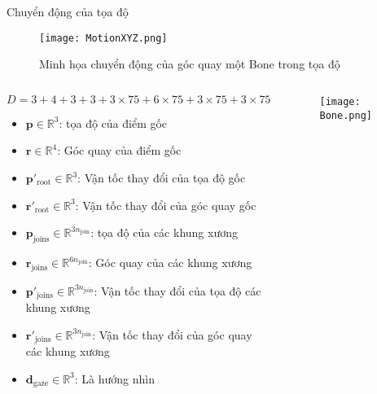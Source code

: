 \begin{frame}{Chuyển động của tọa độ}
		\begin{figure}
		\centering
		\texttt{[image: MotionXYZ.png]}
		\caption{Minh họa chuyển động của góc quay một Bone trong tọa độ}
	\end{figure}
	\vspace{-15pt}
	\begin{columns}
		\begin{column}{0.78\textwidth}
			$$
			D = 3 + 4 + 3 + 3 + 3 \times 75 + 6 \times 75 + 3 \times 75 + 3 \times 75 + 3
			$$
			\vspace{-20pt}
			\begin{itemize}
				\item $\mathbf{p} \in \mathbb{R}^3$: tọa độ của điểm gốc
				\item $\mathbf{r} \in \mathbb{R}^4$: Góc quay của điểm gốc
				\item $\mathbf{p}'_{\text{root}} \in \mathbb{R}^3$: Vận tốc thay đổi của tọa độ gốc
				\item $\mathbf{r}'_{\text{root}} \in \mathbb{R}^3$: Vận tốc thay đổi của góc quay gốc
				
				\item $\mathbf{p}_{\text{joins}} \in \mathbb{R}^{3 n_{\text{join} }}$: tọa độ của các khung xương
				\item $\mathbf{r}_{\text{joins}} \in \mathbb{R}^{6 n_{\text{join} }}$: Góc quay của các khung xương
				\item $\mathbf{p}'_{\text{joins}} \in \mathbb{R}^{3n_{\text{join} }}$: Vận tốc thay đổi của tọa độ các khung xương
				\item $\mathbf{r}'_{\text{joins}} \in \mathbb{R}^{3n_{\text{join} }}$: Vận tốc thay đổi của góc quay các khung xương
				
				\item $\mathbf{d}_{\text{gaze}} \in \mathbb{R}^3$: Là hướng nhìn
			\end{itemize}
		\end{column}
		
		\begin{column}{0.22\textwidth}
			\vspace{12pt}
			\begin{figure}
				\centering
				\texttt{[image: Bone.png]}
			\end{figure}
			
		\end{column}
	\end{columns}
	
\end{frame}

